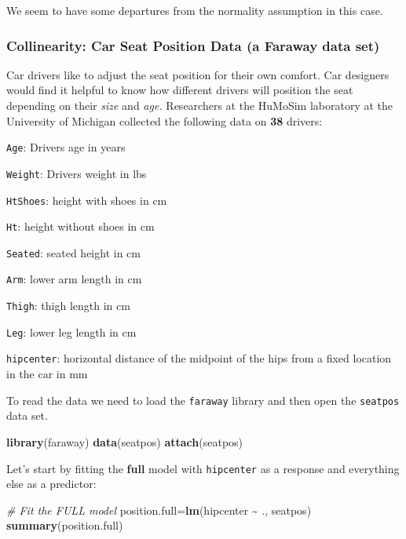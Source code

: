 \documentclass[
]{book}
\newenvironment{Shaded}{\begin{snugshade}}{\end{snugshade}}
\newcommand{\CommentTok}[1]{\textcolor[rgb]{0.56,0.35,0.01}{\textit{#1}}}
\newcommand{\FunctionTok}[1]{\textcolor[rgb]{0.13,0.29,0.53}{\textbf{#1}}}
\newcommand{\NormalTok}[1]{#1}
\newcommand{\OtherTok}[1]{\textcolor[rgb]{0.56,0.35,0.01}{#1}}
\newcommand{\SpecialCharTok}[1]{\textcolor[rgb]{0.81,0.36,0.00}{\textbf{#1}}}
\begin{document}
We seem to have some departures from the normality assumption in this case.

\subsubsection{Collinearity: Car Seat Position Data (a Faraway data set)}\label{collinearity-car-seat-position-data-a-faraway-data-set}

Car drivers like to adjust the seat position for their own comfort.
Car designers would find it helpful to know how different drivers
will position the seat depending on their \emph{size} and \emph{age.} Researchers
at the HuMoSim laboratory at the University of Michigan collected the following data on \textbf{38} drivers:

\texttt{Age}: Drivers age in years

\texttt{Weight}: Drivers weight in lbs

\texttt{HtShoes}: height with shoes in cm

\texttt{Ht}: height without shoes in cm

\texttt{Seated}: seated height in cm

\texttt{Arm}: lower arm length in cm

\texttt{Thigh}: thigh length in cm

\texttt{Leg}: lower leg length in cm

\texttt{hipcenter}: horizontal distance of the midpoint of the hips from a
fixed location in the car in mm

To read the data we need to load the \texttt{faraway} library and then open the \texttt{seatpos} data set.

\begin{Shaded}
\begin{Highlighting}[]
\FunctionTok{library}\NormalTok{(faraway)}
\FunctionTok{data}\NormalTok{(seatpos)}
\FunctionTok{attach}\NormalTok{(seatpos)}
\end{Highlighting}
\end{Shaded}

Let's start by fitting the \textbf{full} model with \texttt{hipcenter} as a response and everything else as a predictor:

\begin{Shaded}
\begin{Highlighting}[]
\CommentTok{\# Fit the FULL model}
\NormalTok{position.full}\OtherTok{=}\FunctionTok{lm}\NormalTok{(hipcenter }\SpecialCharTok{\textasciitilde{}}\NormalTok{ ., seatpos)}
\FunctionTok{summary}\NormalTok{(position.full)}
\end{Highlighting}
\end{Shaded}
\end{document}
